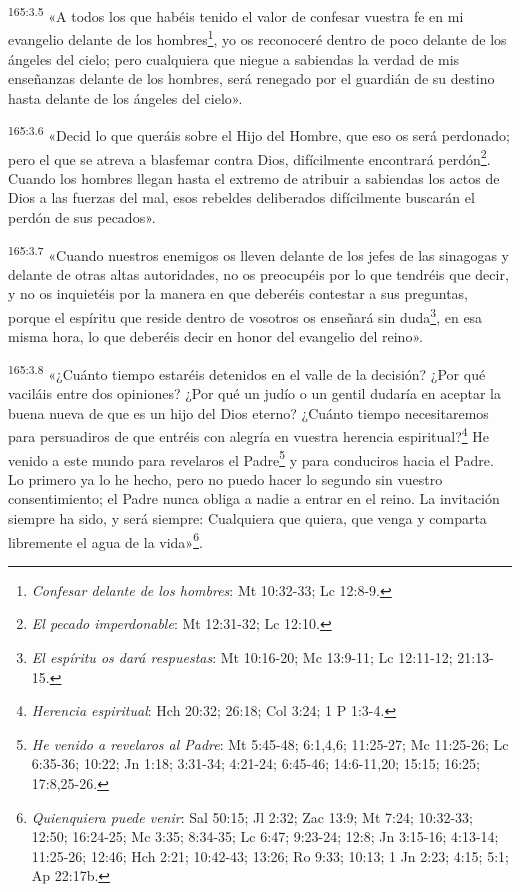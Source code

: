 \par 
\textsuperscript{165:3.5} «A todos los que habéis tenido el valor de confesar vuestra fe en mi evangelio delante de los hombres\footnote{\textit{Confesar delante de los hombres}: Mt 10:32-33; Lc 12:8-9.}, yo os reconoceré dentro de poco delante de los ángeles del cielo; pero cualquiera que niegue a sabiendas la verdad de mis enseñanzas delante de los hombres, será renegado por el guardián de su destino hasta delante de los ángeles del cielo».

\par 
\textsuperscript{165:3.6} «Decid lo que queráis sobre el Hijo del Hombre, que eso os será perdonado; pero el que se atreva a blasfemar contra Dios, difícilmente encontrará perdón\footnote{\textit{El pecado imperdonable}: Mt 12:31-32; Lc 12:10.}. Cuando los hombres llegan hasta el extremo de atribuir a sabiendas los actos de Dios a las fuerzas del mal, esos rebeldes deliberados difícilmente buscarán el perdón de sus pecados».

\par 
\textsuperscript{165:3.7} «Cuando nuestros enemigos os lleven delante de los jefes de las sinagogas y delante de otras altas autoridades, no os preocupéis por lo que tendréis que decir, y no os inquietéis por la manera en que deberéis contestar a sus preguntas, porque el espíritu que reside dentro de vosotros os enseñará sin duda\footnote{\textit{El espíritu os dará respuestas}: Mt 10:16-20; Mc 13:9-11; Lc 12:11-12; 21:13-15.}, en esa misma hora, lo que deberéis decir en honor del evangelio del reino».

\par 
\textsuperscript{165:3.8} «¿Cuánto tiempo estaréis detenidos en el valle de la decisión? ¿Por qué vaciláis entre dos opiniones? ¿Por qué un judío o un gentil dudaría en aceptar la buena nueva de que es un hijo del Dios eterno? ¿Cuánto tiempo necesitaremos para persuadiros de que entréis con alegría en vuestra herencia espiritual?\footnote{\textit{Herencia espiritual}: Hch 20:32; 26:18; Col 3:24; 1 P 1:3-4.} He venido a este mundo para revelaros el Padre\footnote{\textit{He venido a revelaros al Padre}: Mt 5:45-48; 6:1,4,6; 11:25-27; Mc 11:25-26; Lc 6:35-36; 10:22; Jn 1:18; 3:31-34; 4:21-24; 6:45-46; 14:6-11,20; 15:15; 16:25; 17:8,25-26.} y para conduciros hacia el Padre. Lo primero ya lo he hecho, pero no puedo hacer lo segundo sin vuestro consentimiento; el Padre nunca obliga a nadie a entrar en el reino. La invitación siempre ha sido, y será siempre: Cualquiera que quiera, que venga y comparta libremente el agua de la vida»\footnote{\textit{Quienquiera puede venir}: Sal 50:15; Jl 2:32; Zac 13:9; Mt 7:24; 10:32-33; 12:50; 16:24-25; Mc 3:35; 8:34-35; Lc 6:47; 9:23-24; 12:8; Jn 3:15-16; 4:13-14; 11:25-26; 12:46; Hch 2:21; 10:42-43; 13:26; Ro 9:33; 10:13; 1 Jn 2:23; 4:15; 5:1; Ap 22:17b.}.

